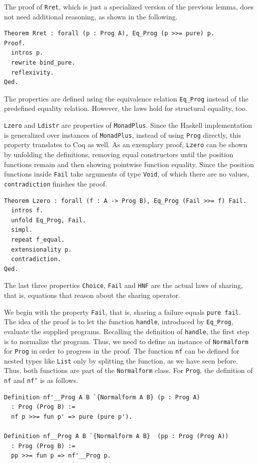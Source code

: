 \documentclass[a4paper, 11pt, fleqn, twoside, abstract=on]{scrreprt}
\newcommand{\hinl}[1]{\texttt{#1}}
\newcommand{\cinl}[1]{\texttt{#1}}
\begin{document}
The proof of \cinl{Rret}, which is just a specialized version of the previous lemma, does not need additional reasoning, as shown in the following.

\begin{verbatim}
Theorem Rret : forall (p : Prog A), Eq_Prog (p >>= pure) p.
Proof.
  intros p.
  rewrite bind_pure.
  reflexivity.
Qed.
\end{verbatim}

The properties are defined using the equivalence relation \cinl{Eq_Prog} instead of the predefined equality relation.
However, the laws hold for structural equality, too.

\cinl{Lzero} and \cinl{Ldistr} are properties of \hinl{MonadPlus}.
Since the Haskell implementation is generalized over instances of \cinl{MonadPlus}, instead of using \cinl{Prog} directly, this property translates to Coq as well.
As an exemplary proof, \cinl{Lzero} can be shown by unfolding the definitions, removing equal constructors until the position functions remain and then showing pointwise function equality.
Since the position functions inside \cinl{Fail} take arguments of type \cinl{Void}, of which there are no values, \cinl{contradiction} finishes the proof.

\begin{verbatim}
Theorem Lzero : forall (f : A -> Prog B), Eq_Prog (Fail >>= f) Fail.
  intros f.
  unfold Eq_Prog, Fail.
  simpl.
  repeat f_equal.
  extensionality p.
  contradiction.
Qed.
\end{verbatim}

The last three properties \cinl{Choice}, \cinl{Fail} and \cinl{HNF} are the actual laws of sharing, that is, equations that reason about the sharing operator.

We begin with the property \cinl{Fail}, that is, sharing a failure equals \cinl{pure fail}.
The idea of the proof is to let the function \cinl{handle}, introduced by \cinl{Eq_Prog}, evaluate the supplied programs.
Recalling the definition of \cinl{handle}, the first step is to normalize the program.
Thus, we need to define an instance of \cinl{Normalform} for \cinl{Prog} in order to progress in the proof.
The function \cinl{nf} can be defined for nested types like \cinl{List} only by splitting the function, as we have seen before.
Thus, both functions are part of the \cinl{Normalform} class.
For \cinl{Prog}, the definition of \cinl{nf} and \cinl{nf'} is as follows.

\begin{verbatim}
Definition nf'__Prog A B `{Normalform A B} (p : Prog A) 
  : Prog (Prog B) :=
  nf p >>= fun p' => pure (pure p').

Definition nf__Prog A B `{Normalform A B}  (pp : Prog (Prog A)) 
  : Prog (Prog B) :=
  pp >>= fun p => nf'__Prog p.
\end{verbatim}
\end{document}
